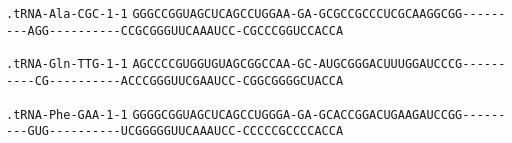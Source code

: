 \documentclass{article}
\newcommand{\rnabox}[1]{\colorbox{#1}{\texttt{#1}}}
\begin{document}
\texttt{.tRNA-Ala-CGC-1-1}
\rnabox{G}\rnabox{G}\rnabox{G}\rnabox{C}\rnabox{C}\rnabox{G}\rnabox{G}\rnabox{U}\rnabox{A}\rnabox{G}\rnabox{C}\rnabox{U}\rnabox{C}\rnabox{A}\rnabox{G}\rnabox{C}\rnabox{C}\rnabox{U}\rnabox{G}\rnabox{G}\rnabox{A}\rnabox{A}\rnabox{-}\rnabox{G}\rnabox{A}\rnabox{-}\rnabox{G}\rnabox{C}\rnabox{G}\rnabox{C}\rnabox{C}\rnabox{G}\rnabox{C}\rnabox{C}\rnabox{C}\rnabox{U}\rnabox{C}\rnabox{G}\rnabox{C}\rnabox{A}\rnabox{A}\rnabox{G}\rnabox{G}\rnabox{C}\rnabox{G}\rnabox{G}\rnabox{-}\rnabox{-}\rnabox{-}\rnabox{-}\rnabox{-}\rnabox{-}\rnabox{-}\rnabox{-}\rnabox{-}\rnabox{A}\rnabox{G}\rnabox{G}\rnabox{-}\rnabox{-}\rnabox{-}\rnabox{-}\rnabox{-}\rnabox{-}\rnabox{-}\rnabox{-}\rnabox{-}\rnabox{-}\rnabox{C}\rnabox{C}\rnabox{G}\rnabox{C}\rnabox{G}\rnabox{G}\rnabox{G}\rnabox{U}\rnabox{U}\rnabox{C}\rnabox{A}\rnabox{A}\rnabox{A}\rnabox{U}\rnabox{C}\rnabox{C}\rnabox{-}\rnabox{C}\rnabox{G}\rnabox{C}\rnabox{C}\rnabox{C}\rnabox{G}\rnabox{G}\rnabox{U}\rnabox{C}\rnabox{C}\rnabox{A}\rnabox{C}\rnabox{C}\rnabox{A}

\vspace{-0.5mm}

\texttt{.tRNA-Gln-TTG-1-1}
\rnabox{A}\rnabox{G}\rnabox{C}\rnabox{C}\rnabox{C}\rnabox{C}\rnabox{G}\rnabox{U}\rnabox{G}\rnabox{G}\rnabox{U}\rnabox{G}\rnabox{U}\rnabox{A}\rnabox{G}\rnabox{C}\rnabox{G}\rnabox{G}\rnabox{C}\rnabox{C}\rnabox{A}\rnabox{A}\rnabox{-}\rnabox{G}\rnabox{C}\rnabox{-}\rnabox{A}\rnabox{U}\rnabox{G}\rnabox{C}\rnabox{G}\rnabox{G}\rnabox{G}\rnabox{A}\rnabox{C}\rnabox{U}\rnabox{U}\rnabox{U}\rnabox{G}\rnabox{G}\rnabox{A}\rnabox{U}\rnabox{C}\rnabox{C}\rnabox{C}\rnabox{G}\rnabox{-}\rnabox{-}\rnabox{-}\rnabox{-}\rnabox{-}\rnabox{-}\rnabox{-}\rnabox{-}\rnabox{-}\rnabox{-}\rnabox{C}\rnabox{G}\rnabox{-}\rnabox{-}\rnabox{-}\rnabox{-}\rnabox{-}\rnabox{-}\rnabox{-}\rnabox{-}\rnabox{-}\rnabox{-}\rnabox{A}\rnabox{C}\rnabox{C}\rnabox{C}\rnabox{G}\rnabox{G}\rnabox{G}\rnabox{U}\rnabox{U}\rnabox{C}\rnabox{G}\rnabox{A}\rnabox{A}\rnabox{U}\rnabox{C}\rnabox{C}\rnabox{-}\rnabox{C}\rnabox{G}\rnabox{G}\rnabox{C}\rnabox{G}\rnabox{G}\rnabox{G}\rnabox{G}\rnabox{C}\rnabox{U}\rnabox{A}\rnabox{C}\rnabox{C}\rnabox{A}

\vspace{-0.5mm}

\texttt{.tRNA-Phe-GAA-1-1}
\rnabox{G}\rnabox{G}\rnabox{G}\rnabox{G}\rnabox{C}\rnabox{G}\rnabox{G}\rnabox{U}\rnabox{A}\rnabox{G}\rnabox{C}\rnabox{U}\rnabox{C}\rnabox{A}\rnabox{G}\rnabox{C}\rnabox{C}\rnabox{U}\rnabox{G}\rnabox{G}\rnabox{G}\rnabox{A}\rnabox{-}\rnabox{G}\rnabox{A}\rnabox{-}\rnabox{G}\rnabox{C}\rnabox{A}\rnabox{C}\rnabox{C}\rnabox{G}\rnabox{G}\rnabox{A}\rnabox{C}\rnabox{U}\rnabox{G}\rnabox{A}\rnabox{A}\rnabox{G}\rnabox{A}\rnabox{U}\rnabox{C}\rnabox{C}\rnabox{G}\rnabox{G}\rnabox{-}\rnabox{-}\rnabox{-}\rnabox{-}\rnabox{-}\rnabox{-}\rnabox{-}\rnabox{-}\rnabox{-}\rnabox{G}\rnabox{U}\rnabox{G}\rnabox{-}\rnabox{-}\rnabox{-}\rnabox{-}\rnabox{-}\rnabox{-}\rnabox{-}\rnabox{-}\rnabox{-}\rnabox{-}\rnabox{U}\rnabox{C}\rnabox{G}\rnabox{G}\rnabox{G}\rnabox{G}\rnabox{G}\rnabox{U}\rnabox{U}\rnabox{C}\rnabox{A}\rnabox{A}\rnabox{A}\rnabox{U}\rnabox{C}\rnabox{C}\rnabox{-}\rnabox{C}\rnabox{C}\rnabox{C}\rnabox{C}\rnabox{C}\rnabox{G}\rnabox{C}\rnabox{C}\rnabox{C}\rnabox{C}\rnabox{A}\rnabox{C}\rnabox{C}\rnabox{A}
\end{document}
